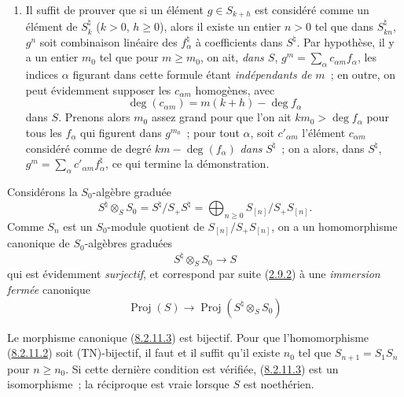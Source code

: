 \begin{enumerate}
\item[\rm(iv)] Il suffit de prouver que si un élément $g\in S_{k+h}$ est
considéré comme un élément de $S_k^\natural$ ($k>0$, $h\geq0$), alors il
existe un entier $n>0$ tel que dans $S_{kn}^\natural$, $g^n$ soit combinaison
linéaire des $f_\alpha^\natural$ à coefficients dans $S^\natural$. Par
hypothèse, il y a un entier $m_0$ tel que pour $m\geq m_0$, on ait, \emph{dans
$S$}, $g^m=\sum_\alpha c_{\alpha m}f_\alpha$, les indices $\alpha$ figurant
dans cette formule étant \emph{indépendants de $m$}~; en outre, on peut
évidemment supposer les $c_{\alpha m}$ homogènes, avec
\[
  \deg(c_{\alpha m})=m(k+h)-\deg f_\alpha
\]
dans $S$. Prenons alors $m_0$ assez grand pour que l'on ait
$km_0>\deg f_\alpha$ pour tous les $f_\alpha$ qui figurent dans $g^{m_0}$~;
pour tout $\alpha$, soit $c'_{\alpha m}$ l'élément $c_{\alpha m}$ considéré
comme de degré $km-\deg(f_\alpha)$ \emph{dans} $S^\natural$~; on a alors, dans
$S^\natural$, $g^m=\sum_\alpha c'_{\alpha m}f_\alpha^\natural$, ce qui
termine la démonstration.
\end{enumerate}

\begin{env}[8.2.11]
\label{II.8.2.11-fr}
Considérons la $S_0$-algèbre graduée
\begin{equation}
\label{II.8.2.11.1-fr}
  S^\natural\otimes_S S_0=S^\natural/S_+S^\natural
  =\bigoplus_{n\geq0}S_{[n]}/S_+S_{[n]}.
\tag{8.2.11.1}
\end{equation}
Comme $S_n$ est un $S_0$-module quotient de $S_{[n]}/S_+S_{[n]}$, on a un
homomorphisme canonique de $S_0$-algèbres graduées
\begin{equation}
\label{II.8.2.11.2-fr}
  S^\natural\otimes_S S_0\to S
\tag{8.2.11.2}
\end{equation}
qui est évidemment \emph{surjectif}, et correspond par suite
(\hyperref[II.2.9.2-fr]{2.9.2}) à une \emph{immersion fermée} canonique
\begin{equation}
\label{II.8.2.11.3-fr}
  \operatorname{Proj}(S)\to
  \operatorname{Proj}(S^\natural\otimes_S S_0)
\tag{8.2.11.3}
\end{equation}
\end{env}


\begin{proposition}[8.2.12]
\label{II.8.2.12-fr}
Le morphisme canonique \textup{(\hyperref[II.8.2.11.3-fr]{8.2.11.3})} est bijectif.
Pour que l'homomorphisme \textup{(\hyperref[II.8.2.11.2-fr]{8.2.11.2})} soit
\textup{(TN)}-bijectif, il faut et il suffit qu'il existe $n_0$ tel que
$S_{n+1}=S_1S_n$ pour $n\geq n_0$. Si cette dernière condition est vérifiée,
\textup{(\hyperref[II.8.2.11.3-fr]{8.2.11.3})} est un isomorphisme~; la réciproque est
vraie lorsque $S$ est noethérien.
\end{proposition}

